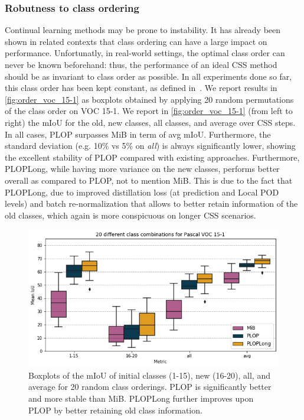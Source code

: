 \subsubsection{Robutness to class ordering}

Continual learning methods may be prone to instability. It has already been shown in related
contexts \citep{kim2019medic} that class ordering can have a large impact on performance.
Unfortunatly, in real-world settings, the optimal class order can never be known beforehand: thus,
the performance of an ideal CSS method should be as invariant to class order as possible. In all
experiments done so far, this class order has been kept constant, as defined
in~\citep{cermelli2020modelingthebackground}. We report results in \autoref{fig:order_voc_15-1} as
boxplots obtained by applying 20 random permutations of the class order on VOC 15-1. We report in
\autoref{fig:order_voc_15-1} (from left to right) the mIoU for the old, new classes, all classes,
and average over CSS steps. In all cases, PLOP surpasses MiB in term of avg mIoU. Furthermore, the
standard deviation (e.g. 10\% vs 5\% on \textit{all}) is always significantly lower, showing the
excellent stability of PLOP compared with existing approaches. Furthermore, PLOPLong, while having
more variance on the new classes, performs better overall as compared to PLOP, not to mention MiB.
This is due to the fact that PLOPLong, due to improved distillation loss (at prediction and Local
POD levels) and batch re-normalization that allows to better retain information of the old classes,
which again is more conspicuous on longer CSS scenarios.




\begin{figure}
    \includegraphics[width=0.9\linewidth]{images/seg/order_voc_15-1.png}
    \vspace*{-0.3cm}
    \caption{Boxplots of the mIoU of initial classes (1-15), new (16-20), all, and average for 20 random class orderings. PLOP is significantly better and more stable than MiB. PLOPLong further improves upon PLOP by better retaining old class information.}
    \label{fig:order_voc_15-1}
\end{figure}


